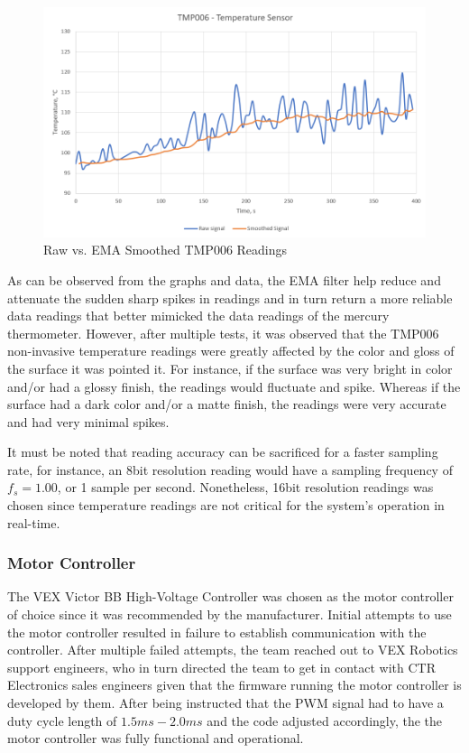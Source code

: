 \begin{figure}[ht]
  \centering
  \includegraphics[width=1.0\textwidth]{Controls/tmp006_signal.PNG}
  \caption{\label{fig:raw_vs_ema} Raw vs. EMA Smoothed TMP006 Readings}
\end{figure}

As can be observed from the graphs and data, the EMA filter help reduce and attenuate the sudden sharp spikes in readings and in turn return a more reliable data readings that better mimicked the data readings of the mercury thermometer. However, after multiple tests, it was observed that the TMP006 non-invasive temperature readings were greatly affected by the color and gloss of the surface it was pointed it. For instance, if the surface was very bright in color and/or had a glossy finish, the readings would fluctuate and spike. Whereas if the surface had a dark color and/or a matte finish, the readings were very accurate and had very minimal spikes.

It must be noted that reading accuracy can be sacrificed for a faster sampling rate, for instance, an 8bit resolution reading would have a sampling frequency of $f_s=1.00$, or 1 sample per second. Nonetheless, 16bit resolution readings was chosen since temperature readings are not critical for the system's operation in real-time.


\subsubsection{Motor Controller}

\indent\indent The VEX Victor BB High-Voltage Controller was chosen as the motor controller of choice since it was recommended by the manufacturer. Initial attempts to use the motor controller resulted in failure to establish communication with the controller. After multiple failed attempts, the team reached out to VEX Robotics support engineers, who in turn directed the team to get in contact with CTR Electronics sales engineers given that the firmware running the motor controller is developed by them. After being instructed that the PWM signal had to have a duty cycle length of $1.5ms - 2.0ms$ and the code adjusted accordingly, the the motor controller was fully functional and operational.

